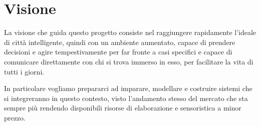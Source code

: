 \section{Visione}

La visione che guida questo progetto consiste nel raggiungere rapidamente l'ideale di citt\`a intelligente, quindi con un ambiente aumentato, capace di prendere decisioni e agire tempestivamente per far fronte a casi specifici e capace di comunicare direttamente con chi si trova immerso in esso, per facilitare la vita di tutti i giorni. 

In particolare vogliamo prepararci ad imparare, modellare e costruire sistemi che si integreranno in questo contesto, visto l'andamento stesso del mercato che sta sempre pi\`u rendendo disponibili risorse di elaborazione e sensoristica a minor prezzo.
